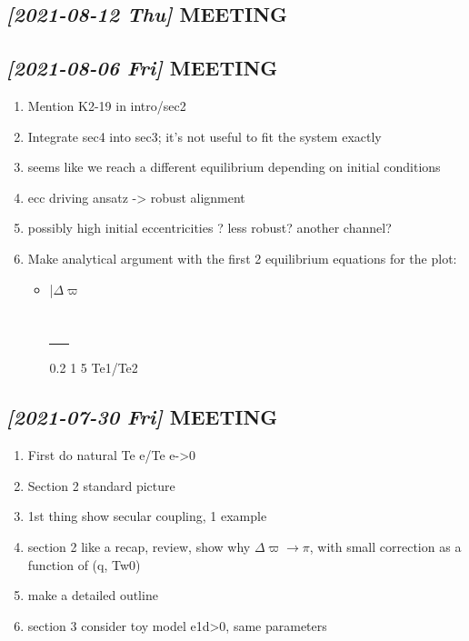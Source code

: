 \documentclass[11pt]{article}
\begin{document}
\subsection{\textit{[2021-08-12 Thu] } MEETING}
\label{sec:orgada5743}

\subsection{\textit{[2021-08-06 Fri] } MEETING}
\label{sec:org501b17f}
\begin{enumerate}
\item Mention K2-19 in intro/sec2
\item Integrate sec4 into sec3; it's not useful to fit the system exactly
\item seems like we reach a different equilibrium depending on initial
conditions
\item ecc driving ansatz -> robust alignment
\item possibly high initial eccentricities ? less robust? another channel?
\item Make analytical argument with the first 2 equilibrium equations
for the plot:
\begin{itemize}
\item |\(\Delta\varpi\)
\begin{center}
\begin{tabular}{}
\\
\uline{\uline{\uline{\uline{\uline{\uline{\uline{\_\_}}}}}}}\\
\end{tabular}
\end{center}
0.2  1  5 Te1/Te2
\end{itemize}
\end{enumerate}
\subsection{\textit{[2021-07-30 Fri] } MEETING}
\label{sec:orge37a360}
\begin{enumerate}
\item First do natural Te e/Te e->0
\item Section 2 standard picture
\item 1st thing show secular coupling, 1 example
\item section 2 like a recap, review, show why \(\Delta\varpi\to\pi\), with
small correction as a function of (q, Tw0)
\item make a detailed outline
\item section 3 consider toy model e1d>0, same parameters
\end{enumerate}
\end{document}
